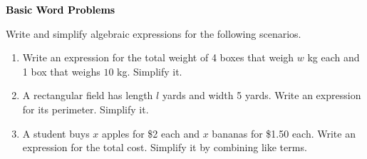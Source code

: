 \documentclass[12pt, letterpaper, fleqn]{article}
\begin{document}
\newpage

\begin{tcolorbox}[colback=black!10]
\large\textcolor{black}{\textbf{Basic Word Problems}}
\end{tcolorbox}

\noindent
Write and simplify algebraic expressions for the following scenarios.

\vspace{3mm}

\begin{enumerate}[itemsep=2.2cm, leftmargin=0.6cm]

\item Write an expression for the total weight of 4 boxes that weigh $w$ kg each and 1 box that weighs $10$ kg. Simplify it.

\vspace{2.2cm}

\item A rectangular field has length $l$ yards and width 5 yards. Write an expression for its perimeter. Simplify it.

\vspace{2.2cm}

\item A student buys $x$ apples for \$2 each and $x$ bananas for \$1.50 each. Write an expression for the total cost. Simplify it by combining like terms.

\vspace{2.2cm}

\end{enumerate}
\end{document}
